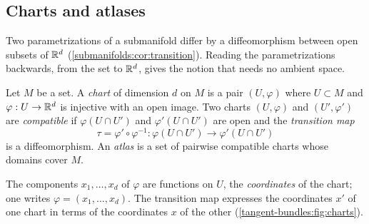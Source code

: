 \begin{notechapter}
\section{Charts and atlases}\label{tangent-bundles:sec:charts}

Two parametrizations of a submanifold differ by a diffeomorphism between
open subsets of $\mathbb{R}^d$ (\cref{submanifolds:cor:transition}). Reading the
parametrizations backwards, from the set to $\mathbb{R}^d$, gives the notion that
needs no ambient space.

\begin{definition}\label{tangent-bundles:def:atlas}
Let $M$ be a set. A \emph{chart} of dimension $d$ on $M$ is a pair
$(U, \varphi)$ where $U\subset M$ and $\varphi:U\to\mathbb{R}^d$ is injective
with an open image. Two charts $(U, \varphi)$ and $(U', \varphi')$ are
\emph{compatible} if $\varphi(U\cap U')$ and $\varphi'(U\cap U')$ are
open and the \emph{transition map}
\[
  \tau = \varphi'\circ\varphi^{-1} :
  \varphi(U\cap U')\to\varphi'(U\cap U')
\]
is a diffeomorphism. An \emph{atlas} is a set of pairwise compatible
charts whose domains cover $M$.
\end{definition}

The components $x_1,\dots,x_d$ of $\varphi$ are functions on $U$, the
\emph{coordinates} of the chart; one writes $\varphi = (x_1,\dots,x_d)$.
The transition map expresses the coordinates $x'$ of one chart in terms
of the coordinates $x$ of the other (\cref{tangent-bundles:fig:charts}).


\end{notechapter}
